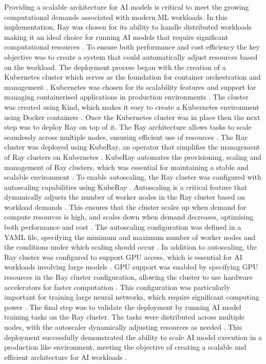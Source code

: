 Providing a scalable architecture for AI models is critical to meet the growing computational demands associated with modern ML workloads. In this implementation, Ray was chosen for its ability to handle distributed workloads making it an ideal choice for running AI models that require significant computational resources \cite{ray_doc}. To ensure both performance and cost efficiency the key objective was to create a system that could automatically adjust resources based on the workload. The deployment process began with the creation of a Kubernetes cluster which serves as the foundation for container orchestration and management \cite{Kubernetes_doc}. Kubernetes was chosen for its scalability features and support for managing containerised applications in production environments \cite{r4}. The cluster was created using Kind, which makes it easy to create a Kubernetes environment using Docker containers \cite{kind2021}. Once the Kubernetes cluster was in place then the next step was to deploy Ray on top of it. The Ray architecture allows tasks to scale seamlessly across multiple nodes, ensuring efficient use of resources \cite{ray_doc}. The Ray cluster was deployed using KubeRay, an operator that simplifies the management of Ray clusters on Kubernetes \cite{ray_doc}. KubeRay automates the provisioning, scaling and management of Ray clusters, which was essential for maintaining a stable and scalable environment \cite{burns2021designing}. To enable autoscaling, the Ray cluster was configured with autoscaling capabilities using KubeRay \cite{ray_doc}. Autoscaling is a critical feature that dynamically adjusts the number of worker nodes in the Ray cluster based on workload demands \cite{Kubernetes_doc}. This ensures that the cluster scales up when demand for compute resources is high, and scales down when demand decreases, optimising both performance and cost \cite{liu2019scalable}. The autoscaling configuration was defined in a YAML file, specifying the minimum and maximum number of worker nodes and the conditions under which scaling should occur \cite{ray_doc}. In addition to autoscaling, the Ray cluster was configured to support GPU access, which is essential for AI workloads involving large models \cite{wong2021gpu}. GPU support was enabled by specifying GPU resources in the Ray cluster configuration, allowing the cluster to use hardware accelerators for faster computation \cite{nvidia_gpu_operator}. This configuration was particularly important for training large neural networks, which require significant computing power \cite{goodfellow2016deep}. The final step was to validate the deployment by running AI model training tasks on the Ray cluster. The tasks were distributed across multiple nodes, with the autoscaler dynamically adjusting resources as needed \cite{spark_unified_engine}. This deployment successfully demonstrated the ability to scale AI model execution in a production like environment, meeting the objective of creating a scalable and efficient architecture for AI workloads \cite{dean2008mapreduce}.

